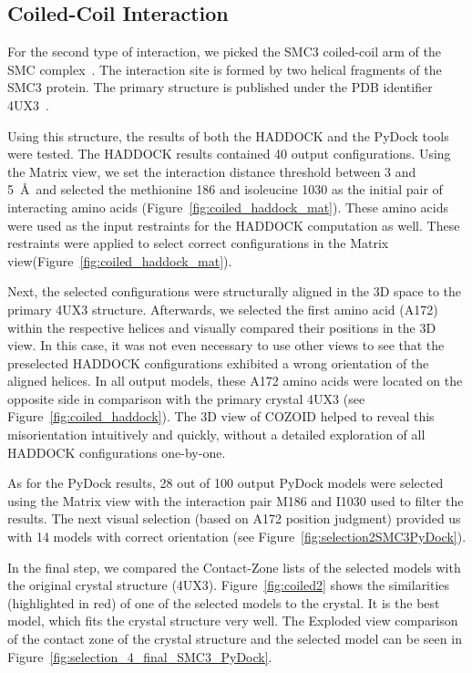 \documentclass{bmcart}
\def\ExpView {Exploded view\xspace}
\def\MatView {Matrix view\xspace}
\def\CoZoLists{Contact-Zone lists\xspace}
\begin{document}
\subsection*{Coiled-Coil Interaction}
For the second type of interaction, we picked the SMC3 coiled-coil arm of the SMC complex~\cite{Gligoris}.
The interaction site is formed by two helical fragments of the SMC3 protein.
The primary structure is published under the PDB identifier 4UX3~\cite{pmid25414305}.  

Using this structure, the results of both the HADDOCK and the PyDock tools were tested.
The HADDOCK results contained 40 output configurations.
Using the \MatView, we set the interaction distance threshold between 3 and 5~\AA~and selected the methionine 186 and isoleucine 1030 as the initial pair of interacting amino acids (Figure~\ref{fig:coiled_haddock_mat}). 
These amino acids were used as the input restraints for the HADDOCK computation as well.
These restraints were applied to select correct configurations in the \MatView (Figure~\ref{fig:coiled_haddock_mat}).

Next, the selected configurations were structurally aligned in the 3D space to the primary 4UX3 structure.
Afterwards, we selected the first amino acid (A172) within the respective helices and visually compared their positions in the 3D view.
In this case, it was not even necessary to use other views to see that the preselected HADDOCK configurations exhibited a wrong orientation of the aligned helices. 
In all output models, these A172 amino acids were located on the opposite side in comparison with the primary crystal 4UX3 (see Figure~\ref{fig:coiled_haddock}). 
The 3D view of COZOID helped to reveal this misorientation intuitively and quickly, without a detailed exploration of all HADDOCK configurations one-by-one.

As for the PyDock results, 28 out of 100 output PyDock models were selected using the \MatView with the interaction pair M186 and I1030 used to filter the results.
The next visual selection (based on A172 position judgment) provided us with 14 models with correct orientation (see Figure~\ref{fig:selection2SMC3PyDock}).

In the final step, we compared the \CoZoLists of the selected models with the original crystal structure (4UX3). 
Figure~\ref{fig:coiled2} shows the similarities (highlighted in red) of one of the selected models to the crystal. It is the best model, which fits the crystal structure very well. The \ExpView comparison of the contact zone of the crystal structure and the selected model can be seen in Figure~\ref{fig:selection_4_final_SMC3_PyDock}.
\end{document}
